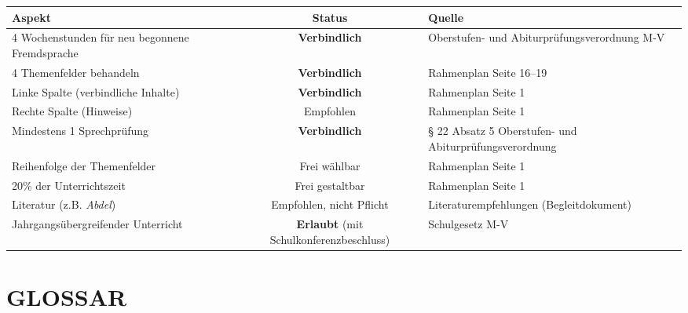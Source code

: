 \documentclass[10pt,a4paper]{article}
\begin{document}
\begin{center}
\small
\begin{tabular}{|p{6cm}|c|p{5cm}|}
\hline
\rowcolor{lightgray}
\textbf{Aspekt} & \textbf{Status} & \textbf{Quelle} \\
\hline
4 Wochenstunden für neu begonnene Fremdsprache & \textbf{Verbindlich} & Oberstufen- und Abiturprüfungsverordnung M-V \\
\hline
4 Themenfelder behandeln & \textbf{Verbindlich} & Rahmenplan Seite 16--19 \\
\hline
Linke Spalte (verbindliche Inhalte) & \textbf{Verbindlich} & Rahmenplan Seite 1 \\
\hline
Rechte Spalte (Hinweise) & Empfohlen & Rahmenplan Seite 1 \\
\hline
Mindestens 1 Sprechprüfung & \textbf{Verbindlich} & § 22 Absatz 5 Oberstufen- und Abiturprüfungsverordnung \\
\hline
Reihenfolge der Themenfelder & Frei wählbar & Rahmenplan Seite 1 \\
\hline
20\% der Unterrichtszeit & Frei gestaltbar & Rahmenplan Seite 1 \\
\hline
Literatur (z.B. \textit{Abdel}) & Empfohlen, nicht Pflicht & Literaturempfehlungen (Begleitdokument) \\
\hline
Jahrgangsübergreifender Unterricht & \textbf{Erlaubt} (mit Schulkonferenzbeschluss) & Schulgesetz M-V \\
\hline
\end{tabular}
\end{center}

\newpage


\section*{GLOSSAR}
\end{document}
